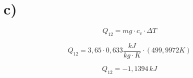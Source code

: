 

\section*{c)}

\[
Q_{12} = mg \cdot c_v \cdot \Delta T
\]

\[
Q_{12} = 3,65 \cdot 0,633 \frac{kJ}{kg \cdot K} \cdot (499,9972 K)
\]

\[
Q_{12} = -1,1394 \, kJ
\]